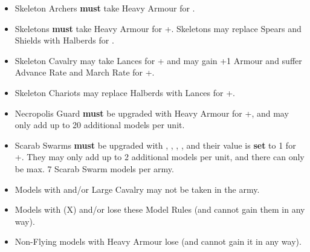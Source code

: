 \subtitle{\lordofthebarrowlegion}

\begin{itemize}
\item Skeleton Archers \textbf{must} take Heavy Armour for \free{}.

\item  Skeletons \textbf{must} take Heavy Armour for +\permodel{}. Skeletons may replace Spears and Shields with Halberds for \free{}.

\item Skeleton Cavalry may take Lances for +\permodel{} and may gain +1 Armour and suffer \minuss{} Advance Rate and \minuss{} March Rate for +\permodel{}.

\item \rnf{} Skeleton Chariots may replace Halberds with Lances for +\permodel{}.

\item Necropolis Guard \textbf{must} be upgraded with Heavy Armour for +\permodel{}, and may only add up to 20 additional models per unit.

\item Scarab Swarms \textbf{must} be upgraded with \textbf{}, \textbf{}, \textbf{\ghoststep}, \textbf{\magicalattacks}, and their \resurrected{} value is \textbf{set} to 1 for +\permodel{}. They may only add up to 2 additional models per unit, and there can only be max. 7 Scarab Swarm models per army.

\item Models with \toweringpresence{} and/or Large Cavalry may not be taken in the army.

\item Models with \specialambush{} (X) and/or \scout{} lose these Model Rules (and cannot gain them in any way).

\item Non-Flying models with Heavy Armour lose \lighttroops{} (and cannot gain it in any way).
\end{itemize}

